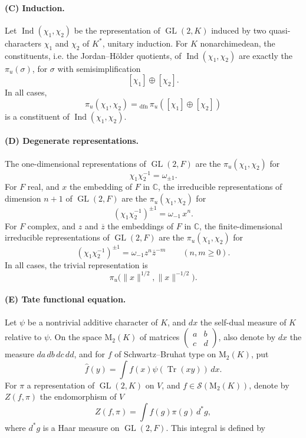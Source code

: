 \documentclass[10pt,a4paper]{article}
\providecommand{\GL}{\operatorname{GL}}
\providecommand{\Tr}{\operatorname{Tr}}
\providecommand{\Ind}{\operatorname{Ind}}
\providecommand{\C}{\mathbb C}
\providecommand{\M}{\mathrm M}
\providecommand{\cS}{\mathcal S}
\begin{document}
\clearpage
{}
\hypertarget{authority-43}{}
\paragraph{(C) Induction.} Let \(\Ind(\chi_1,\chi_2)\) be the representation of \(\GL(2,K)\) induced by two quasi-characters \(\chi_1\) and \(\chi_2\) of \(K^*\), unitary induction. For \(K\) nonarchimedean, the constituents, i.e. the Jordan--Hölder quotients, of \(\Ind(\chi_1,\chi_2)\) are exactly the \(\pi_u(\sigma)\), for \(\sigma\) with semisimplification
\[
[\chi_1]\oplus[\chi_2].
\]
In all cases,
\[
\pi_u(\chi_1,\chi_2)={}_{\mathrm{dfn}}\,\pi_u([\chi_1]\oplus[\chi_2])
\]
is a constituent of \(\Ind(\chi_1,\chi_2)\).

\paragraph{(D) Degenerate representations.} The one-dimensional representations of \(\GL(2,F)\) are the \(\pi_u(\chi_1,\chi_2)\) for
\[
\chi_1\chi_2^{-1}=\omega_{\pm1}.
\]
For \(F\) real, and \(x\) the embedding of \(F\) in \(\C\), the irreducible representations of dimension \(n+1\) of \(\GL(2,F)\) are the \(\pi_u(\chi_1,\chi_2)\) for
\[
(\chi_1\chi_2^{-1})^{\pm1}=\omega_{-1}\,x^n.
\]
For \(F\) complex, and \(z\) and \(\overline z\) the embeddings of \(F\) in \(\C\), the finite-dimensional irreducible representations of \(\GL(2,F)\) are the \(\pi_u(\chi_1,\chi_2)\) for
\[
(\chi_1\chi_2^{-1})^{\pm1}=\omega_{-1}z^n\overline z^{-m}\qquad(n,m\ge0).
\]
In all cases, the trivial representation is
\[
\pi_u\bigl(\|x\|^{1/2},\|x\|^{-1/2}\bigr).
\]

\paragraph{(E) Tate functional equation.} Let \(\psi\) be a nontrivial additive character of \(K\), and \(dx\) the self-dual measure of \(K\) relative to \(\psi\). On the space \(\M_2(K)\) of matrices \(\left(\begin{smallmatrix}a&b\\ c&d\end{smallmatrix}\right)\), also denote by \(dx\) the measure \(da\,db\,dc\,dd\), and for \(f\) of Schwartz--Bruhat type on \(\M_2(K)\), put
\[
\widehat f(y)=\int f(x)\psi(\Tr(xy))\,dx.
\]
For \(\pi\) a representation of \(\GL(2,K)\) on \(V\), and \(f\in\cS(\M_2(K))\), denote by \(Z(f,\pi)\) the endomorphism of \(V\)
\[
Z(f,\pi)=\int f(g)\pi(g)\,d^*g,
\]
where \(d^*g\) is a Haar measure on \(\GL(2,F)\). This integral is defined by
\end{document}
